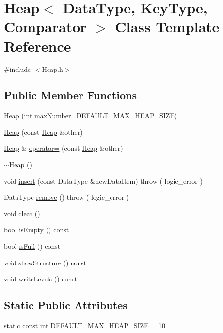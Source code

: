 \hypertarget{class_heap}{\section{\-Heap$<$ \-Data\-Type, \-Key\-Type, \-Comparator $>$ \-Class \-Template \-Reference}
\label{class_heap}
}


{\ttfamily \#include $<$\-Heap.\-h$>$}

\subsection*{\-Public \-Member \-Functions}
\begin{DoxyCompactItemize}
\item 
\hyperlink{class_heap_ae17e34e3c86d88263a8fdf80b9ba78fc}{\-Heap} (int max\-Number=\hyperlink{class_heap_a967c19732a20a72e8e824402ad6763c8}{\-D\-E\-F\-A\-U\-L\-T\-\_\-\-M\-A\-X\-\_\-\-H\-E\-A\-P\-\_\-\-S\-I\-Z\-E})
\item 
\hyperlink{class_heap_a97e3b462be1c6af31d7519546bba8907}{\-Heap} (const \hyperlink{class_heap}{\-Heap} \&other)
\item 
\hyperlink{class_heap}{\-Heap} \& \hyperlink{class_heap_a5ed119341c39bcea1437321d4247dd40}{operator=} (const \hyperlink{class_heap}{\-Heap} \&other)
\item 
\hyperlink{class_heap_a555ade7891007de959bef0ee53e28767}{$\sim$\-Heap} ()
\item 
void \hyperlink{class_heap_aa68cf80454ab1b246fa723612805a91e}{insert} (const \-Data\-Type \&new\-Data\-Item)  throw ( logic\-\_\-error )
\item 
\-Data\-Type \hyperlink{class_heap_a4a18bfdacd897c45fc3da13f22b8930d}{remove} ()  throw ( logic\-\_\-error )
\item 
void \hyperlink{class_heap_a19a78c8eae2cf7c8253e34e54d86ed73}{clear} ()
\item 
bool \hyperlink{class_heap_ab8fa26d416ac0e27dfcbf18c54f8f73f}{is\-Empty} () const 
\item 
bool \hyperlink{class_heap_ac9111b884c74a376240e0155a788756e}{is\-Full} () const 
\item 
void \hyperlink{class_heap_a3ae1e1f27a145749c8b9f2da777cb8bc}{show\-Structure} () const 
\item 
void \hyperlink{class_heap_a4bdb1772ea92899de245d6cbd217d085}{write\-Levels} () const 
\end{DoxyCompactItemize}
\subsection*{\-Static \-Public \-Attributes}
\begin{DoxyCompactItemize}
\item 
static const int \hyperlink{class_heap_a967c19732a20a72e8e824402ad6763c8}{\-D\-E\-F\-A\-U\-L\-T\-\_\-\-M\-A\-X\-\_\-\-H\-E\-A\-P\-\_\-\-S\-I\-Z\-E} = 10
\end{DoxyCompactItemize}
